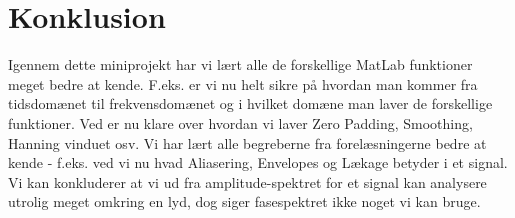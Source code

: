 \documentclass[12pt, letterpaper]{article}
\begin{document}
\section{Konklusion}
Igennem dette miniprojekt har vi lært alle de forskellige MatLab funktioner meget bedre at kende. F.eks. er vi nu helt sikre på hvordan man kommer fra tidsdomænet til frekvensdomænet og i hvilket domæne man laver de forskellige funktioner. Ved er nu klare over hvordan vi laver Zero Padding, Smoothing, Hanning vinduet osv. 
Vi har lært alle begreberne fra forelæsningerne bedre at kende - f.eks. ved vi nu hvad Aliasering, Envelopes og Lækage betyder i et signal. 
Vi kan konkluderer at vi ud fra amplitude-spektret for et signal kan analysere utrolig meget omkring en lyd, dog siger fasespektret ikke noget vi kan bruge. 
\end{document}
